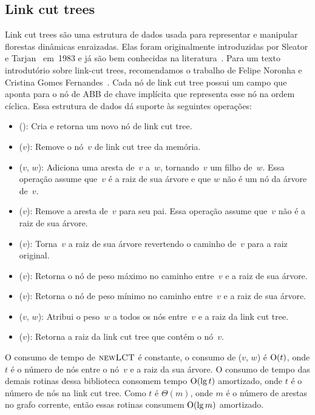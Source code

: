 \subsection{Link cut trees}
\label{sec:linkcuttree}
Link cut trees são uma estrutura de dados usada para representar e manipular florestas dinâmicas enraizadas.
Elas foram originalmente introduzidas por Sleator e Tarjan~\cite{SleatroTarjanLinkCutTree1983,} em~1983 e já são bem conhecidas na literatura~\cite{linkcuttree,EncyclopediaAlgorithms,tarjanWerneck2010}.
Para um texto introdutório sobre link-cut trees, recomendamos o trabalho de Felipe Noronha e Cristina Gomes Fernandes~\cite{linkcuttree}.
Cada nó de link cut tree possui um campo  que aponta para o nó de ABB de chave implícita que representa esse nó na ordem cíclica.
Essa estrutura de dados dá suporte às seguintes operações:
\begin{itemize}
\item \linkcutCreate(): Cria e retorna um novo nó de link cut tree.
\item \linkcutDestroy($v$): Remove o nó~$v$ de link cut tree da memória.
\item \linkcutAddEdge($v$, $w$): Adiciona uma aresta de~$v$ a~$w$, tornando~$v$ um filho de~$w$. Essa operação assume que~$v$ é a raiz de sua árvore e que $w$ não é um nó da árvore de~$v$.
\item \linkcutDelEdge($v$): Remove a aresta de~$v$ para seu pai.
	Essa operação assume que~$v$ não é a raiz de sua árvore.
\item \linkcutEvert($v$): Torna~$v$ a raiz de sua árvore revertendo o caminho de~$v$ para a raiz original.
\item \linkcutMax($v$): Retorna o nó de peso máximo no caminho entre~$v$ e a raiz de sua árvore.
\item \linkcutMin($v$): Retorna o nó de peso mínimo no caminho entre~$v$ e a raiz de sua árvore.
\item \linkcutWeight($v$, $w$): Atribui o peso~$w$ a todos os nós entre~$v$ e a raiz da link cut tree.
\item \linkcutRoot($v$): Retorna a raiz da link cut tree que contém o nó~$v$.
\end{itemize}

O consumo de tempo de $\text{\scshape newLCT}$ é constante, o consumo de \linkcutWeight($v$, $w$) é $\mathrm{O}(t)$, onde $t$ é o número de nós entre o nó~$v$ e a raiz da sua árvore. O consumo de tempo das demais rotinas dessa biblioteca consomem tempo $\mathrm{O}(\lg t)$ amortizado, onde $t$ é o número de nós na link cut tree. Como $t$ é $\Theta(m)$, onde $m$ é o número de arestas no grafo corrente, então essas rotinas consumem $\mathrm{O}(\lg m)$ amortizado.


